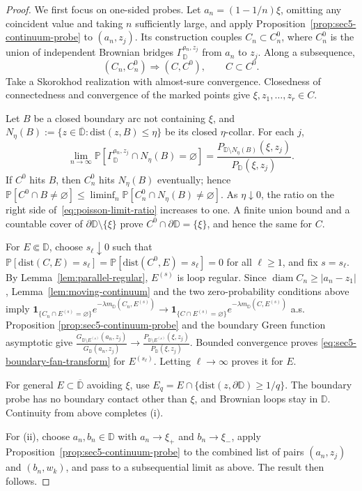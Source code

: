 \documentclass[11pt]{article}
\numberwithin{equation}{section}
\newcommand{\D}{\mathbb{D}}
\newcommand{\1}{\mathbf{1}}
\newcommand{\dist}{\mathrm{dist}}
\newcommand\ol[1]{\overline{#1}}
\newcommand{\diam}{\operatorname{diam}}
\newcommand{\one}{\mathbf 1}
\newcommand{\Prob}{\mathbb P}
\begin{document}
\begin{proof}
We first focus on one-sided probes.
Let \(a_n=(1-1/n)\xi\), omitting any coincident value and taking \(n\)
sufficiently large, and apply
Proposition~\ref{prop:sec5-continuum-probe} to \((a_n,z_j)\).  Its
construction couples \(C_n\subset C_n^0\), where \(C_n^0\) is the union of independent Brownian bridges $\Gamma_\D^{a_n,z_j}$ from \(a_n\) to \(z_j\).  Along a subsequence,
\[
 (C_n,C_n^0)\Longrightarrow(C,C^0),\qquad C\subset C^0.
\]
Take a Skorokhod realization with almost-sure convergence. Closedness of
connectedness and convergence of the marked points give
\(\xi,z_1,\ldots,z_r\in C\).

Let \(B\) be a closed boundary arc not
containing \(\xi\), and \(N_\eta(B):=\{z\in\ol\D:\dist(z,B)\leq\eta\}\) be its closed \(\eta\)-collar.  For each
\(j\),
\begin{equation}\label{eq:poisson-limit-ratio}
 \lim_{n\to\infty}
 \Prob[\Gamma_\D^{a_n,z_j}\cap N_\eta(B)=\varnothing]
 =
 \frac{P_{\D\setminus N_\eta(B)}(\xi,z_j)}{P_\D(\xi,z_j)}.
\end{equation}
If \(C^0\) hits \(B\), then \(C_n^0\) hits \(N_\eta(B)\) eventually; hence $\Prob[C^0\cap B\ne\varnothing]
 \leq\liminf_n\Prob[C_n^0\cap N_\eta(B)\ne\varnothing]$.
As \(\eta\downarrow0\), the ratio on the right side of~\eqref{eq:poisson-limit-ratio} increases to one.  A finite union bound
and a countable cover of
\(\partial\D\setminus\{\xi\}\) prove
\(C^0\cap\partial\D=\{\xi\}\), and hence the same for \(C\).

For \(E\Subset\D\), choose \(s_\ell\downarrow0\) such that $\Prob[\dist(C,E)=s_\ell]=\Prob[\dist(C^0,E)=s_\ell]=0$ for all $\ell\geq1$,
and fix \(s=s_\ell\).  By
Lemma~\ref{lem:parallel-regular}, \(E^{(s)}\) is loop regular.  Since
\(\diam C_n\geq |a_n-z_1|\), Lemma~\ref{lem:moving-continuum} and the
two
zero-probability conditions above imply $\one_{\{C_n\cap E^{(s)}=\varnothing\}}
 e^{-\lambda m_\D(C_n,E^{(s)})}
 \longrightarrow
 \one_{\{C\cap E^{(s)}=\varnothing\}}
 e^{-\lambda m_\D(C,E^{(s)})}$
a.s.  Proposition
\ref{prop:sec5-continuum-probe} and the boundary Green function asymptotic give
\(
 \frac{G_{\D\setminus E^{(s)}}(a_n,z_j)}{G_\D(a_n,z_j)}
 \longrightarrow
 \frac{P_{\D\setminus E^{(s)}}(\xi,z_j)}{P_\D(\xi,z_j)}
\).
Bounded convergence proves \eqref{eq:sec5-boundary-fan-transform} for
\(E^{(s_\ell)}\).  Letting \(\ell\to\infty\) proves it for \(E\).

For general \(E\subset\ol\D\) avoiding \(\xi\), use
\(E_q=E\cap\{\dist(z,\partial\D)\geq1/q\}\).  The boundary probe has no boundary
contact other than \(\xi\), and Brownian loops stay in \(\D\). Continuity
from above completes \textup{(i)}.

For \textup{(ii)}, choose
$a_n,b_n\in\D$ with $a_n\to\xi_+$ and $b_n\to\xi_-$, apply
Proposition~\ref{prop:sec5-continuum-probe} to the combined list of pairs $(a_n,z_j)$ and
$(b_n,w_k)$, and pass to a subsequential limit as above. The result then follows.
\end{proof}
\end{document}
